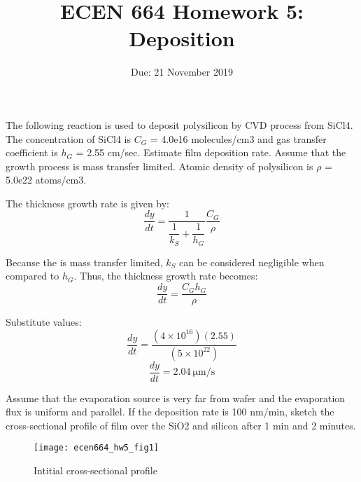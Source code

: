 \documentclass[10pt,a4paper]{article}
\title{ECEN 664 Homework 5: Deposition}
\date{Due: 21 November 2019}
\begin{document}
	\maketitle

	{}
	
	The following reaction is used to deposit polysilicon by CVD process from SiCl4. The
	concentration of SiCl4 is $C_{G}$ = 4.0e16 molecules/cm3 and gas transfer coefficient is
	$h_{G}$ = 2.55 cm/sec. Estimate film deposition rate. Assume that the growth process is mass transfer limited. Atomic density of polysilicon is $\rho$ = 5.0e22 atoms/cm3.
	
	The thickness growth rate is given by:
	\[\dfrac{dy}{dt} = \dfrac{1}{\dfrac{1}{k_{S}} + \dfrac{1}{h_{G}}} \dfrac{C_{G}}{\rho}\]
	
	Because the is mass transfer limited, $k_{S}$ can be considered negligible when compared to $h_{G}$. Thus, the thickness growth rate becomes:
	\[\dfrac{dy}{dt} = \dfrac{C_{G}h_{G}}{\rho}\]
	
	Substitute values:
	\[\dfrac{dy}{dt} = \dfrac{(4 \times 10^{16})(2.55)}{(5 \times 10^{22})}\]
	\[\boxed{\dfrac{dy}{dt} = \SI{2.04}{\micro\meter/\second}}\] \bigbreak
	
	\clearpage
	
	{}
	
	Assume that the evaporation source is very far from wafer and the evaporation flux is
	uniform and parallel. If the deposition rate is 100 nm/min, sketch the cross-sectional
	profile of film over the SiO2 and silicon after 1 min and 2 minutes.
	
	\vspace*{10mm}

	\begin{figure}[h]
		\centering
		\texttt{[image: ecen664\_hw5\_fig1]}
		\caption{Intitial cross-sectional profile}
	\end{figure}

	\vspace*{20mm}
\end{document}
